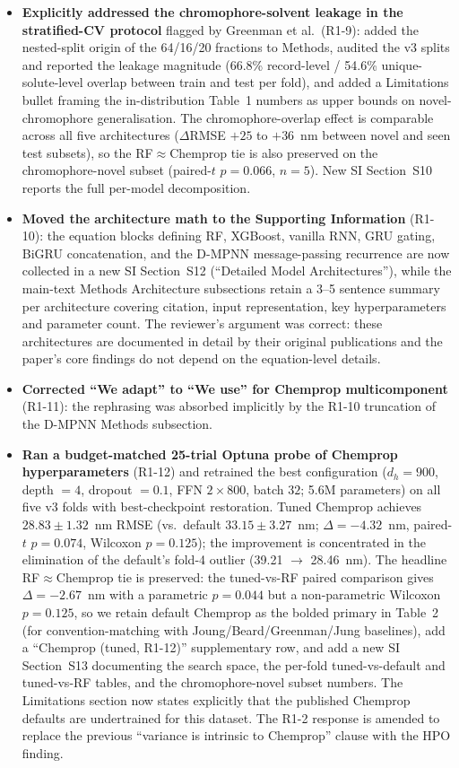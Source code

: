\documentclass[11pt]{article}
\begin{document}
\begin{itemize}[leftmargin=2em]
  \item \textbf{Explicitly addressed the chromophore-solvent leakage in the stratified-CV protocol} flagged by Greenman et al.\ (R1-9): added the nested-split origin of the 64/16/20 fractions to Methods, audited the v3 splits and reported the leakage magnitude (66.8\% record-level / 54.6\% unique-solute-level overlap between train and test per fold), and added a Limitations bullet framing the in-distribution Table~1 numbers as upper bounds on novel-chromophore generalisation. The chromophore-overlap effect is comparable across all five architectures ($\Delta$RMSE $+25$ to $+36$~nm between novel and seen test subsets), so the RF$\approx$Chemprop tie is also preserved on the chromophore-novel subset (paired-$t$ $p = 0.066$, $n = 5$). New SI Section~S10 reports the full per-model decomposition.
  \item \textbf{Moved the architecture math to the Supporting Information} (R1-10): the equation blocks defining RF, XGBoost, vanilla RNN, GRU gating, BiGRU concatenation, and the D-MPNN message-passing recurrence are now collected in a new SI Section~S12 (``Detailed Model Architectures''), while the main-text Methods Architecture subsections retain a 3--5 sentence summary per architecture covering citation, input representation, key hyperparameters and parameter count. The reviewer's argument was correct: these architectures are documented in detail by their original publications and the paper's core findings do not depend on the equation-level details.
  \item \textbf{Corrected ``We adapt'' to ``We use'' for Chemprop multicomponent} (R1-11): the rephrasing was absorbed implicitly by the R1-10 truncation of the D-MPNN Methods subsection.
  \item \textbf{Ran a budget-matched 25-trial Optuna probe of Chemprop hyperparameters} (R1-12) and retrained the best configuration ($d_h = 900$, depth $= 4$, dropout $= 0.1$, FFN $2 \times 800$, batch $32$; 5.6M parameters) on all five v3 folds with best-checkpoint restoration. Tuned Chemprop achieves $28.83 \pm 1.32$~nm RMSE (vs.\ default $33.15 \pm 3.27$~nm; $\Delta = -4.32$~nm, paired-$t$ $p = 0.074$, Wilcoxon $p = 0.125$); the improvement is concentrated in the elimination of the default's fold-4 outlier (39.21 $\to$ 28.46~nm). The headline RF$\approx$Chemprop tie is preserved: the tuned-vs-RF paired comparison gives $\Delta = -2.67$~nm with a parametric $p = 0.044$ but a non-parametric Wilcoxon $p = 0.125$, so we retain default Chemprop as the bolded primary in Table~2 (for convention-matching with Joung/Beard/Greenman/Jung baselines), add a ``Chemprop (tuned, R1-12)'' supplementary row, and add a new SI Section~S13 documenting the search space, the per-fold tuned-vs-default and tuned-vs-RF tables, and the chromophore-novel subset numbers. The Limitations section now states explicitly that the published Chemprop defaults are undertrained for this dataset. The R1-2 response is amended to replace the previous ``variance is intrinsic to Chemprop'' clause with the HPO finding.

\end{itemize}
\end{document}

